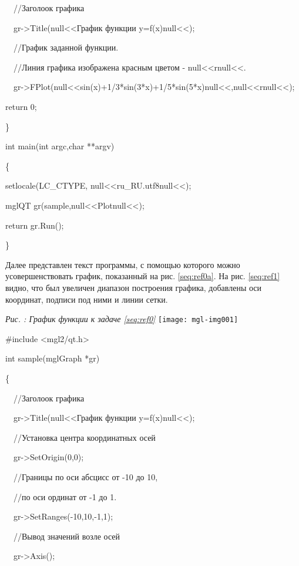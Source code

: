 \ \ //Заголоок графика

\ \ gr-{\textgreater}Title(null{<<}График функции y=f(x)null{<<});

\ \ //График заданной функции.

{\upshape
\ \ //Линия графика изображена красным цветом {}- null{<<}rnull{<<}.}

\ \ gr-{\textgreater}FPlot(null{<<}sin(x)+1/3*sin(3*x)+1/5*sin(5*x)null{<<},null{<<}rnull{<<});

return 0;

\}

int main(int argc,char **argv)

\{

setlocale(LC\_CTYPE, null{<<}ru\_RU.utf8null{<<});

mglQT gr(sample,null{<<}Plotnull{<<});

return gr.Run();

\}

Далее представлен текст программы, с помощью которого можно усовершенствовать график, показанный на рис.
\ref{seq:ref0a}. На рис. \ref{seq:ref1} видно, что был увеличен диапазон построения графика, добавлены оси координат,
подписи под ними и линии сетки.

\begin{minipage}{10.961cm}
{\itshape
Рис. {\theqwertya\label{seq:ref0a}}: График функции к задаче \ref{seq:ref0}}
\texttt{[image: mgl-img001]}\end{minipage}

{\upshape
\#include {\textless}mgl2/qt.h{\textgreater}}

{\upshape
int sample(mglGraph *gr)}

{\upshape
\{}

{\upshape
\ \ //Заголоок графика}

{\upshape
\ \ gr-{\textgreater}Title(null{<<}График функции y=f(x)null{<<});}

{\upshape
\ \ //Установка центра координатных осей}

{\upshape
\ \ gr-{\textgreater}SetOrigin(0,0);}

{\upshape
\ \ //Границы по оси абсцисс от -10 до 10,}

\ \ //по оси ординат от -1 до 1.

{\upshape
\ \ gr-{\textgreater}SetRanges(-10,10,-1,1);}

{\upshape
\ \ //Вывод значений возле осей}

{\upshape
\ \ gr-{\textgreater}Axis();}

